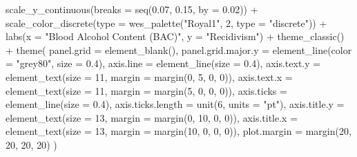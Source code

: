 \documentclass[
  11pt,
]{article}
\newenvironment{Shaded}{\begin{snugshade}}{\end{snugshade}}
\newcommand{\AttributeTok}[1]{\textcolor[rgb]{0.77,0.63,0.00}{#1}}
\newcommand{\DecValTok}[1]{\textcolor[rgb]{0.00,0.00,0.81}{#1}}
\newcommand{\FloatTok}[1]{\textcolor[rgb]{0.00,0.00,0.81}{#1}}
\newcommand{\FunctionTok}[1]{\textcolor[rgb]{0.00,0.00,0.00}{#1}}
\newcommand{\NormalTok}[1]{#1}
\newcommand{\SpecialCharTok}[1]{\textcolor[rgb]{0.00,0.00,0.00}{#1}}
\newcommand{\StringTok}[1]{\textcolor[rgb]{0.31,0.60,0.02}{#1}}
\begin{document}
\begin{Shaded}
\begin{Highlighting}[]
  \FunctionTok{scale\_y\_continuous}\NormalTok{(}\AttributeTok{breaks =} \FunctionTok{seq}\NormalTok{(}\FloatTok{0.07}\NormalTok{, }\FloatTok{0.15}\NormalTok{, }\AttributeTok{by =} \FloatTok{0.02}\NormalTok{)) }\SpecialCharTok{+}
  \FunctionTok{scale\_color\_discrete}\NormalTok{(}\AttributeTok{type =} \FunctionTok{wes\_palette}\NormalTok{(}\StringTok{"Royal1"}\NormalTok{, }\DecValTok{2}\NormalTok{, }\AttributeTok{type =} \StringTok{"discrete"}\NormalTok{)) }\SpecialCharTok{+}
  \FunctionTok{labs}\NormalTok{(}\AttributeTok{x =} \StringTok{"Blood Alcohol Content (BAC)"}\NormalTok{, }\AttributeTok{y =} \StringTok{"Recidivism"}\NormalTok{) }\SpecialCharTok{+}
  \FunctionTok{theme\_classic}\NormalTok{() }\SpecialCharTok{+}
  \FunctionTok{theme}\NormalTok{(}
    \AttributeTok{panel.grid =} \FunctionTok{element\_blank}\NormalTok{(),}
    \AttributeTok{panel.grid.major.y =} \FunctionTok{element\_line}\NormalTok{(}\AttributeTok{color =} \StringTok{"grey80"}\NormalTok{, }\AttributeTok{size =} \FloatTok{0.4}\NormalTok{),}
    \AttributeTok{axis.line =} \FunctionTok{element\_line}\NormalTok{(}\AttributeTok{size =} \FloatTok{0.4}\NormalTok{),}
    \AttributeTok{axis.text.y =} \FunctionTok{element\_text}\NormalTok{(}\AttributeTok{size =} \DecValTok{11}\NormalTok{, }\AttributeTok{margin =} \FunctionTok{margin}\NormalTok{(}\DecValTok{0}\NormalTok{, }\DecValTok{5}\NormalTok{, }\DecValTok{0}\NormalTok{, }\DecValTok{0}\NormalTok{)),}
    \AttributeTok{axis.text.x =} \FunctionTok{element\_text}\NormalTok{(}\AttributeTok{size =} \DecValTok{11}\NormalTok{, }\AttributeTok{margin =} \FunctionTok{margin}\NormalTok{(}\DecValTok{5}\NormalTok{, }\DecValTok{0}\NormalTok{, }\DecValTok{0}\NormalTok{, }\DecValTok{0}\NormalTok{)),}
    \AttributeTok{axis.ticks =} \FunctionTok{element\_line}\NormalTok{(}\AttributeTok{size =} \FloatTok{0.4}\NormalTok{),}
    \AttributeTok{axis.ticks.length =} \FunctionTok{unit}\NormalTok{(}\DecValTok{6}\NormalTok{, }\AttributeTok{units =} \StringTok{"pt"}\NormalTok{),}
    \AttributeTok{axis.title.y =} \FunctionTok{element\_text}\NormalTok{(}\AttributeTok{size =} \DecValTok{13}\NormalTok{, }\AttributeTok{margin =} \FunctionTok{margin}\NormalTok{(}\DecValTok{0}\NormalTok{, }\DecValTok{10}\NormalTok{, }\DecValTok{0}\NormalTok{, }\DecValTok{0}\NormalTok{)),}
    \AttributeTok{axis.title.x =} \FunctionTok{element\_text}\NormalTok{(}\AttributeTok{size =} \DecValTok{13}\NormalTok{, }\AttributeTok{margin =} \FunctionTok{margin}\NormalTok{(}\DecValTok{10}\NormalTok{, }\DecValTok{0}\NormalTok{, }\DecValTok{0}\NormalTok{, }\DecValTok{0}\NormalTok{)),}
    \AttributeTok{plot.margin =} \FunctionTok{margin}\NormalTok{(}\DecValTok{20}\NormalTok{, }\DecValTok{20}\NormalTok{, }\DecValTok{20}\NormalTok{, }\DecValTok{20}\NormalTok{)}
\NormalTok{  )}
\end{Highlighting}
\end{Shaded}
\end{document}

